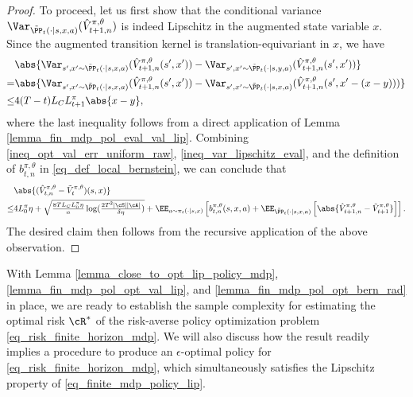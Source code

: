 \documentclass[9pt]{article}
\numberwithin{equation}{section}
\begin{document}
\begin{proof}
To proceed, let us first show that the conditional variance $\Var_{\tilde{\PP}_t(\cdot|s,x,a)} (\hat{V}_{t+1, n}^{\pi, \theta})$ is indeed Lipschitz in the augmented state variable $x$.
    Since the augmented transition kernel is translation-equivariant in $x$, we have
    \begin{align}
    & \abs{ \Var_{s',x' \sim \tilde{\PP}_t (\cdot|s,x,a)}(\hat{V}_{t+1,n}^{\pi, \theta}(s',x')) -   \Var_{s',x' \sim \tilde{\PP}_t (\cdot|s,y,a)}(\hat{V}_{t+1,n}^{\pi, \theta}(s',x'))  }  \nonumber \\
   =     & \abs{\Var_{s',x' \sim \tilde{\PP}_t (\cdot|s,x,a)}(\hat{V}_{t+1,n}^{\pi, \theta}(s',x')) - \Var_{s',x' \sim \tilde{\PP}_t (\cdot|s,x,a)}(\hat{V}_{t+1,n}^{\pi, \theta}(s',x' - (x-y)))} \nonumber \\
        \leq &  4 (T-t) L_C L_{t+1}^\pi \abs{x-y}, \label{ineq_var_lipschitz_eval}
    \end{align}
    where the last inequality follows from a direct application of Lemma \ref{lemma_fin_mdp_pol_eval_val_lip}.
Combining \eqref{ineq_opt_val_err_uniform_raw}, \eqref{ineq_var_lipschitz_eval}, and the definition of $b_{t,n}^{\pi, \theta}$ in \eqref{eq_def_local_bernstein}, we can conclude that 
  \begin{align*}
         & \abs{(\hat{V}_{t,n}^{\pi, \theta} - \tilde{V}_{t}^{\pi, \theta})(s,x)}\nonumber \\
       \leq & 4L_{0}^\pi \eta + \sqrt{\tfrac{8 T L_C L_{0}^\pi \eta}{n} \log(\tfrac{2T^2 |\cS| |\cA|}{\delta \eta})} +  \EE_{a \sim \pi_t (\cdot|s,x)} \left[ b_{t,n}^{\pi, \theta}(s,x, a) + \EE_{\tilde{\PP}_t (\cdot|s,x,a)}\left[\abs{\hat{V}_{t+1,n}^{\pi, \theta} - \tilde{V}_{t+1}^{\pi, \theta}} \right] \right].
\end{align*}
 The desired claim then follows from the recursive application of the above observation.
\end{proof}


With Lemma \ref{lemma_close_to_opt_lip_policy_mdp}, \ref{lemma_fin_mdp_pol_opt_val_lip}, and \ref{lemma_fin_mdp_pol_opt_bern_rad} in place, we are ready to establish the sample complexity for estimating the optimal risk $\cR^*$ of the risk-averse policy optimization problem \eqref{eq_risk_finite_horizon_mdp}.
We will also discuss how the result readily implies a procedure to produce an $\epsilon$-optimal policy for \eqref{eq_risk_finite_horizon_mdp}, which simultaneously satisfies the Lipschitz  property of \eqref{eq_finite_mdp_policy_lip}.
\end{document}
